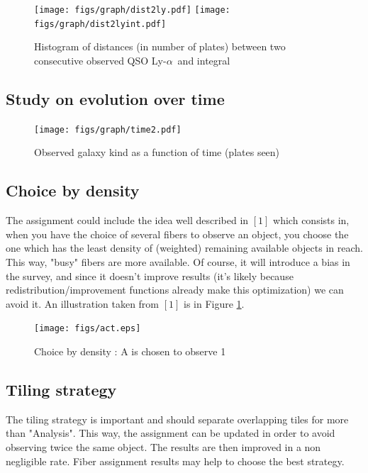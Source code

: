 \documentclass{article}
\def\lya{Ly-$\alpha$\ }
\begin{document}
\begin{figure}[H]\begin{center}
	\texttt{[image: figs/graph/dist2ly.pdf]}
	\texttt{[image: figs/graph/dist2lyint.pdf]}\hfill
	\caption{Histogram of distances (in number of plates) between two consecutive observed QSO \lya and integral}
\end{center}\end{figure}

\subsection{Study on evolution over time}

\begin{figure}[H]\begin{center}
	\texttt{[image: figs/graph/time2.pdf]}
	\caption{Observed galaxy kind as a function of time (plates seen)}
\end{center}\end{figure}

\subsection{Choice by density}
The assignment could include the idea well described in $[1]$ which consists in, when you have the choice of several fibers to observe an object, you choose the one which has the least density of (weighted) remaining available objects in reach. This way, "busy" fibers are more available. Of course, it will introduce a bias in the survey, and since it doesn't improve results (it's likely because redistribution/improvement functions already make this optimization) we can avoid it. An illustration taken from $[1]$ is in Figure \ref{act}.

\begin{figure}[H]\begin{center}
	\texttt{[image: figs/act.eps]}
	\caption{Choice by density : A is chosen to observe 1}\label{act}
\end{center}\end{figure}

\subsection{Tiling strategy}
The tiling strategy is important and should separate overlapping tiles for more than "Analysis". This way, the assignment can be updated in order to avoid observing twice the same object. The results are then improved in a non negligible rate. Fiber assignment results may help to choose the best strategy.
\end{document}

